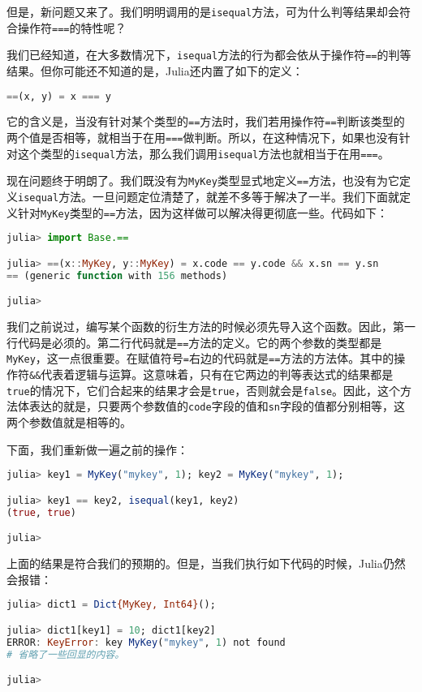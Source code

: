 但是，新问题又来了。我们明明调用的是\verb`isequal`方法，可为什么判等结果却会符合操作符\verb`===`的特性呢？

我们已经知道，在大多数情况下，\verb`isequal`方法的行为都会依从于操作符\verb`==`的判等结果。但你可能还不知道的是，Julia还内置了如下的定义：
\begin{lstlisting}[language=julia]
==(x, y) = x === y
\end{lstlisting}

它的含义是，当没有针对某个类型的\verb`==`方法时，我们若用操作符\verb`==`判断该类型的两个值是否相等，就相当于在用\verb`===`做判断。所以，在这种情况下，如果也没有针对这个类型的\verb`isequal`方法，那么我们调用\verb`isequal`方法也就相当于在用\verb`===`。

现在问题终于明朗了。我们既没有为\verb`MyKey`类型显式地定义\verb`==`方法，也没有为它定义\verb`isequal`方法。一旦问题定位清楚了，就差不多等于解决了一半。我们下面就定义针对\verb`MyKey`类型的\verb`==`方法，因为这样做可以解决得更彻底一些。代码如下：
\begin{lstlisting}[language=julia]
julia> import Base.==

julia> ==(x::MyKey, y::MyKey) = x.code == y.code && x.sn == y.sn
== (generic function with 156 methods)

julia> 
\end{lstlisting}

我们之前说过，编写某个函数的衍生方法的时候必须先导入这个函数。因此，第一行代码是必须的。第二行代码就是\verb`==`方法的定义。它的两个参数的类型都是\verb`MyKey`，这一点很重要。在赋值符号\verb`=`右边的代码就是\verb`==`方法的方法体。其中的操作符\verb`&&`代表着逻辑与运算。这意味着，只有在它两边的判等表达式的结果都是\verb`true`的情况下，它们合起来的结果才会是\verb`true`，否则就会是\verb`false`。因此，这个方法体表达的就是，只要两个参数值的\verb`code`字段的值和\verb`sn`字段的值都分别相等，这两个参数值就是相等的。

下面，我们重新做一遍之前的操作：
\begin{lstlisting}[language=julia]
julia> key1 = MyKey("mykey", 1); key2 = MyKey("mykey", 1);

julia> key1 == key2, isequal(key1, key2)
(true, true)

julia>
\end{lstlisting}

上面的结果是符合我们的预期的。但是，当我们执行如下代码的时候，Julia仍然会报错：
\begin{lstlisting}[language=julia]
julia> dict1 = Dict{MyKey, Int64}(); 

julia> dict1[key1] = 10; dict1[key2]
ERROR: KeyError: key MyKey("mykey", 1) not found
# 省略了一些回显的内容。

julia>  
\end{lstlisting}

